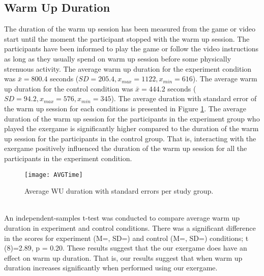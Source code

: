 \subsection{Warm Up Duration}
The duration of the warm up session has been measured from the game or video start until the moment the participant stopped with the warm up session. The participants have been informed to play the game or follow the video instructions as long as they usually spend on warm up session before some physically strenuous activity. The average warm up duration for the experiment condition was \begin{math}\bar{x} = 800.4 \end{math} seconds (\begin{math} SD = 205.4, x_{max}=1122, x_{min}=616 \end{math}). The average warm up duration for the control condition was \begin{math}\bar{x} = 444.2 \end{math} seconds (\begin{math} SD = 94.2, x_{max}= 576, x_{min}= 345\end{math}). The average duration with standard error of the warm up session for each conditions is presented in Figure \ref{fig:wuduration}. The average duration of the warm up session for the participants in the experiment group who played the exergame is significantly higher compared to the duration of the warm up session for the participants in the control group. That is, interacting with the exergame positively influenced the duration of the warm up session for all the participants in the experiment condition.\\
\begin{figure}[h]
    \centering
    \texttt{[image: AVGTime]}
    \caption{Average WU duration with standard errors per study group.}
    \label{fig:wuduration}
\end{figure}\\
An independent-samples t-test was conducted to compare average warm up duration in experiment and control conditions. There was a significant difference in the scores for experiment (M=, SD=) and control (M=, SD=) conditions; t (8)=2.89, p = 0.20. These results suggest that the our exergame does have an effect on warm up duration. That is, our results suggest that when warm up duration increases significantly when performed using our exergame. 
